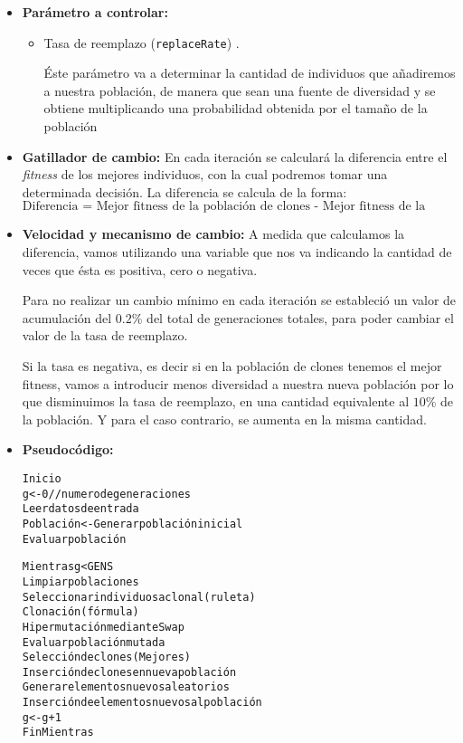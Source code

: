 \begin{itemize}
\item \textbf{Parámetro a controlar:}
\begin{itemize}
	\item Tasa de reemplazo (\texttt{replaceRate}) \blue{[0,1]}.

	Éste parámetro va a determinar la cantidad de individuos que añadiremos a nuestra población,
	de manera que sean una fuente de diversidad y se obtiene multiplicando una probabilidad obtenida por
 el tamaño de la población
\end{itemize}
\item \textbf{Gatillador de cambio:} 
	En cada iteración se calculará la diferencia entre el \emph{fitness} de los mejores
	individuos, con la cual podremos tomar una determinada decisión.
	La diferencia se calcula de la forma:
	$$\text{Diferencia =  Mejor fitness de la población de clones - Mejor fitness de la población actual}$$
\item \textbf{Velocidad y mecanismo de cambio:} 
	A medida que calculamos la diferencia, vamos utilizando una variable que nos va indicando
	la cantidad de veces que ésta es positiva, cero o negativa.

	Para no realizar un cambio mínimo en cada iteración se estableció un valor de acumulación
	del $0.2\%$ del total de generaciones totales, para poder cambiar el valor de la tasa de reemplazo.

	Si la tasa es negativa, es decir si en la población de clones tenemos el mejor fitness, vamos a
	introducir menos diversidad a nuestra nueva población por lo que disminuimos la tasa de reemplazo,
	en una cantidad equivalente al $10\%$ de la población. Y para el caso contrario, se aumenta en la misma
	cantidad.
\newpage
\item \textbf{Pseudocódigo:} 
\begin{alltt}
    Inicio
    g <- 0 // numero de generaciones
    Leer datos de entrada
    Población <- Generar población inicial
    Evaluar población

    Mientras g < GENS
        Limpiar poblaciones
        Seleccionar individuos a clonal (ruleta)
        Clonación (fórmula)
        Hipermutación mediante Swap
        Evaluar población mutada
        Selección de clones (Mejores)
        Inserción de clones en nueva población
        Generar elementos nuevos aleatorios
        Inserción de elementos nuevos al población
        g <- g + 1
    Fin Mientras


\end{alltt}
\end{itemize}

